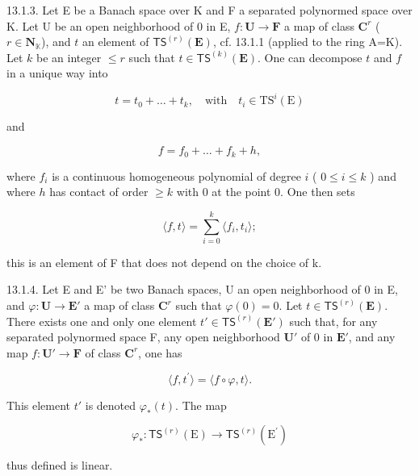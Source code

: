 13.1.3. Let E be a Banach space over K and F a separated polynormed space over K. Let U be an open neighborhood of 0 in E, \(f\colon\mathbf{U}\to\mathbf{F}\) a map of class \(\mathbf{C}^{r}\) (\(r\in\mathbf{N}_{\mathbb{K}}\)), and \(t\) an element of \(\mathsf{TS}^{(r)}(\mathbf{E})\), cf. 13.1.1 (applied to the ring A=K). Let \(k\) be an integer \(\leqslant r\) such that \(t\in\mathsf{TS}^{(k)}(\mathbf{E})\). One can decompose \(t\) and \(f\) in a unique way into

\[
t=t_{0}+\dots+t_{k},\quad\text{with}\quad t_{i}\in\mathrm{TS}^{i}(\mathrm{E})
\]

and

\[
f = f _ {0} + \dots + f _ {k} + h,
\]

where \(f_i\) is a continuous homogeneous polynomial of degree \(i\) ( \(0 \leqslant i \leqslant k\) ) and where \(h\) has contact of order \(\geqslant k\) with 0 at the point 0. One then sets

\[
\langle f, t \rangle = \sum_ {i = 0} ^ {k} \langle f _ {i}, t _ {i} \rangle ;
\]

this is an element of F that does not depend on the choice of k.

13.1.4. Let E and E' be two Banach spaces, U an open neighborhood of 0 in E, and \(\varphi\colon\mathbf{U}\to\mathbf{E}'\) a map of class \(\mathbf{C}^{r}\) such that \(\varphi(0)=0\). Let \(t\in\mathsf{TS}^{(r)}(\mathbf{E})\). There exists one and only one element \(t'\in\mathsf{TS}^{(r)}(\mathbf{E}')\) such that, for any separated polynormed space F, any open neighborhood \(\mathbf{U}'\) of 0 in \(\mathbf{E}'\), and any map \(f\colon\mathbf{U}'\to\mathbf{F}\) of class \(\mathbf{C}^{r}\), one has

\[
\langle f, t ^ {\prime} \rangle = \langle f \circ \varphi , t \rangle .\tag{*}
\]

This element \(t'\) is denoted \(\varphi_{*}(t)\). The map

\[
\varphi_ {*} \colon \mathsf {T S} ^ {(r)} (\mathrm{E}) \to \mathsf {T S} ^ {(r)} (\mathrm{E} ^ {\prime})
\]

thus defined is linear.
\relax{}

